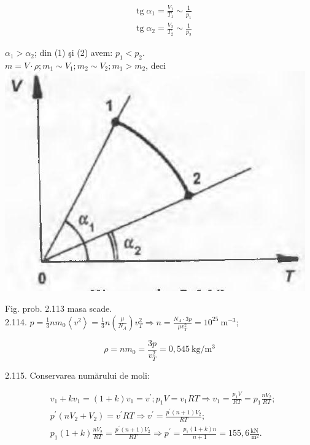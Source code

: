 \documentclass[10pt]{article}
\begin{document}
\begin{align*}
& \operatorname{tg} \alpha_{1}=\frac{V_{1}}{T_{1}} \sim \frac{1}{p_{1}}  \tag{1}\\
& \operatorname{tg} \alpha_{2}=\frac{V_{2}}{T_{2}} \sim \frac{1}{p_{2}} \tag{2}
\end{align*}


$\alpha_{1}>\alpha_{2}$; din (1) şi (2) avem: $p_{1}<p_{2}$.\\
$m=V \cdot \rho ; m_{1} \sim V_{1} ; m_{2} \sim V_{2} ; m_{1}>m_{2}$, deci\\
\includegraphics[max width=\textwidth, center]{2025_07_01_5b3ff9fa0d508c8e9f17g-293(1)}

Fig. prob. 2.113 masa scade.\\
2.114. $p=\frac{1}{3} n m_{0}\left\langle v^{2}\right\rangle=\frac{1}{3} n\left(\frac{\mu}{N_{A}}\right) v_{T}^{2} \Rightarrow n=\frac{N_{A} \cdot 3 p}{\mu v_{T}^{2}}=10^{25} \mathrm{~m}^{-3}$;

$$
\rho=n m_{0}=\frac{3 p}{v_{T}^{2}}=0,545 \mathrm{~kg} / \mathrm{m}^{3}
$$

2.115. Conservarea numărului de moli:

$$
\begin{aligned}
& v_{1}+k v_{1}=(1+k) v_{1}=v^{\prime} ; p_{1} V=v_{1} R T \Rightarrow v_{1}=\frac{p_{1} V}{R T}=p_{1} \frac{n V_{2}}{R T} ; \\
& p^{\prime}\left(n V_{2}+V_{2}\right)=v^{\prime} R T \Rightarrow v^{\prime}=\frac{p^{\prime}(n+1) V_{2}}{R T} ; \\
& p_{1}(1+k) \frac{n V_{2}}{R T}=\frac{p^{\prime}(n+1) V_{2}}{R T} \Rightarrow p^{\prime}=\frac{p_{1}(1+k) n}{n+1}=155,6 \frac{\mathrm{kN}}{\mathrm{~m}^{2}} .
\end{aligned}
$$
\end{document}
